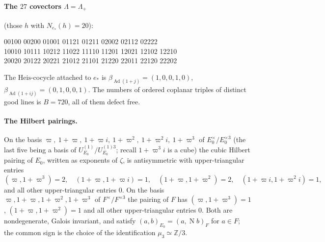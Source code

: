 \documentclass[11pt]{article}
\newcommand{\Z}{\mathbb Z}
\newcommand{\Nm}{\operatorname N}
\newcommand{\Ad}{\operatorname{Ad}}
\newcommand{\Heis}{\mathrm{Heis}}
\theoremstyle{plain}
\theoremstyle{definition}
\begin{document}
\paragraph{The $27$ covectors $\Lambda=\Lambda_+$} (those $h$ with $N_{e_*}(h)=20$):
\begin{center}\small{} 00100 00200 01001 01121 01211 02002 02112 02222\\
10010 10111 10212 11022 11110 11201 12021 12102 12210\\
20020 20122 20221 21012 21101 21220 22011 22120 22202
\end{center}
The $\Heis$-cocycle attached to $e_*$ is $\beta_{\Ad(1+j)}=(1,0,0,1,0)$,
$\beta_{\Ad(1+ij)}=(0,1,0,0,1)$.  The numbers of ordered coplanar
triples of distinct good lines is $B=720$, all of them defect free.
\paragraph{The Hilbert pairings.}  On the basis
$\varpi,\ 1+\varpi,\ 1+\varpi i,\ 1+\varpi^2,\ 1+\varpi^2i,\ 1+\varpi^3$ of
$E_0^\times/E_0^{\times3}$ (the last five being a basis of
$U^{(1)}_{E_0}/U^{(1)3}_{E_0}$; recall $1+\varpi^3 i$ is a cube) the cubic
Hilbert pairing of $E_0$, written as exponents of $\zeta$, is
antisymmetric with upper-triangular entries
\[
 (\varpi,1+\varpi^3)=2,\quad (1+\varpi,1+\varpi i)=1,\quad (1+\varpi,1+\varpi^2)=2,\quad
 (1+\varpi i,1+\varpi^2 i)=1,
\]
and all other upper-triangular entries $0$.  On the basis
$\varpi,1+\varpi,1+\varpi^2,1+\varpi^3$ of $F^\times/F^{\times3}$ the pairing of $F$
has $(\varpi,1+\varpi^3)=1$, $(1+\varpi,1+\varpi^2)=1$ and all other
upper-triangular entries $0$.  Both are nondegenerate, Galois
invariant, and satisfy $(a,b)_{E_0}=(a,\Nm b)_F$ for $a\in F$; the common
sign is the choice of the identification $\mu_3\simeq\Z/3$.
\end{document}
